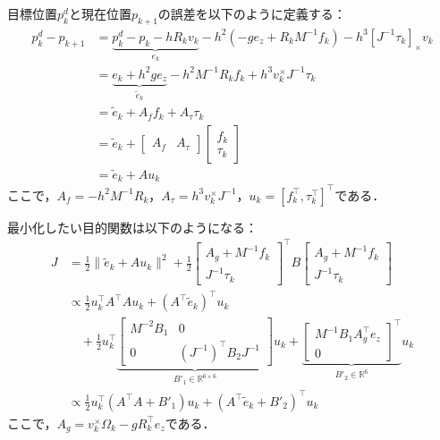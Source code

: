 目標位置$p^d_k$と現在位置$p_{k+1}$の誤差を以下のように定義する：
\begin{equation}
\begin{aligned}
p^d_k - p_{k+1} &= \underbrace{p^d_k - p_k - h R_k v_k}_{e_k} - h^2 (-g e_z + R_k M^{-1} f_k) - h^3 [J^{-1} \tau_k]_\times v_k \\
&= \underbrace{e_k + h^2 g e_z}_{\tilde{e}_k} - h^2 M^{-1} R_k f_k + h^3 v_k^\times J^{-1} \tau_k \\
&= \tilde{e}_k + A_f f_k + A_\tau \tau_k \\
&= \tilde{e}_k + \begin{bmatrix} A_f & A_\tau \end{bmatrix} \begin{bmatrix} f_k \\ \tau_k \end{bmatrix} \\
&= \tilde{e}_k + A u_k
\label{eq:error}
\end{aligned}
\end{equation}
ここで，$A_f = -h^2 M^{-1} R_k$，$A_\tau = h^3 v_k^\times J^{-1}$，$u_k = [f_k^\top, \tau_k^\top]^\top$である．

最小化したい目的関数は以下のようになる：
\begin{equation}
\begin{aligned}
J &= \frac{1}{2} \|\tilde{e}_k + A u_k\|^2 + \frac{1}{2} \begin{bmatrix} A_g + M^{-1} f_k \\ J^{-1} \tau_k \end{bmatrix}^\top B \begin{bmatrix} A_g + M^{-1} f_k \\ J^{-1} \tau_k \end{bmatrix} \\
&\propto \frac{1}{2} u_k^\top A^\top A u_k + (A^\top \tilde{e}_k)^\top u_k \\
&\quad + \frac{1}{2} u_k^\top \underbrace{\begin{bmatrix} M^{-2} B_1 & 0 \\ 0 & (J^{-1})^\top B_2 J^{-1} \end{bmatrix}}_{B'_1 \in \mathbb{R}^{6 \times 6}} u_k + \underbrace{\begin{bmatrix} M^{-1} B_1 A_g^\top e_z \\ 0 \end{bmatrix}^\top}_{B'_2 \in \mathbb{R}^6} u_k \\
&\propto \frac{1}{2} u_k^\top (A^\top A + B'_1) u_k + (A^\top \tilde{e}_k + B'_2)^\top u_k
\label{eq:objective}
\end{aligned}
\end{equation}
ここで，$A_g = v_k^\times \Omega_k - g R_k^\top e_z$である．

